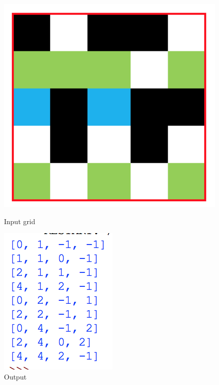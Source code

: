 \documentclass[titlepage]{article}
\begin{document}
\begin{figure}[!htb]
  \includegraphics[width=\linewidth]{greenode.png}
  \caption{Input grid}\label{fig:euc}
\endminipage\hfill
{}
  \includegraphics[width=\linewidth]{nodenbr.png}
  \caption{Output}\label{fig:manhat}
\endminipage\hfill
\end{figure}
\end{document}
